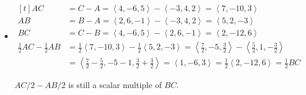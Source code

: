 \documentclass{article}
\begin{document}
\begin{itemize}
	\item[(d)]
		$\begin{aligned}[t]
			AC 
			&=C-A 
			=\left< 4,-6,5 \right>-\left< -3,4,2 \right>
			=\left< 7, -10, 3 \right> \\
			AB 
			&=B-A 
			=\left< 2,6,-1 \right>-\left< -3,4,2 \right>
			=\left< 5,2,-3 \right> \\
			BC 
			&=C-B 
			=\left< 4,-6,5 \right>-\left< 2,6,-1 \right>
			=\left< 2,-12,6 \right> \\
		    \frac12AC-\frac12AB
			&=\frac12 \left< 7,-10,3 \right>-\frac{1}{2}\left< 5,2,-3 \right>
			=\left< \frac72,-5,\frac32 \right>-\left< \frac52,1,-\frac32 \right> \\
			&=\left< \frac72-\frac52, -5-1, \frac32+\frac32 \right>
			=\boxed{\left< 1, -6, 3 \right>}
			=\frac12 \left< 2,-12,6 \right>
			=\frac12 BC
		\end{aligned}$

		$AC/2-AB/2$ is still a scalar multiple of $BC$.
\end{itemize}
\end{document}

